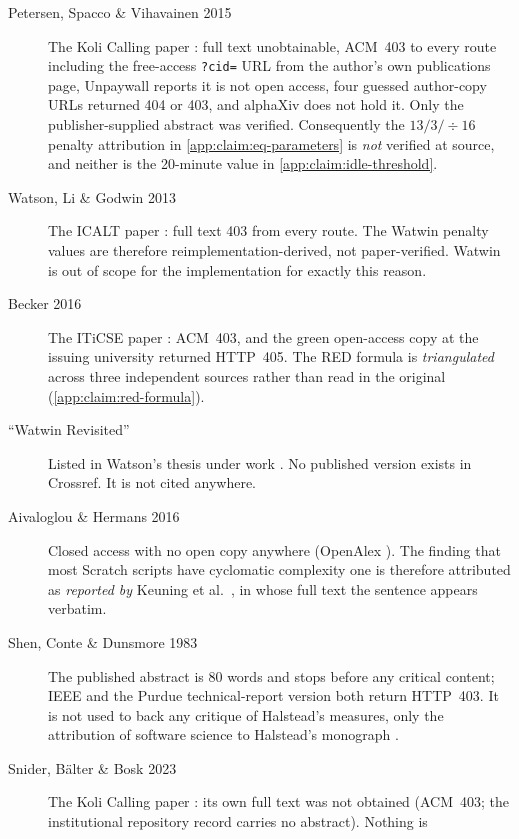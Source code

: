 \begin{description}
\item[Petersen, Spacco \& Vihavainen 2015] The Koli Calling paper
  \autocite{petersen2015exploration}: full text unobtainable, ACM~403 to
  every route including the free-access \nolinkurl{?cid=} URL from the
  author's own publications page, Unpaywall
  reports it is not open access, four guessed author-copy URLs returned 404
  or 403, and alphaXiv does not hold it.  Only the publisher-supplied
  abstract was verified.  Consequently the \(13/3/{\div}16\) penalty
  attribution in \cref{app:claim:eq-parameters} is \emph{not} verified at
  source, and neither is the 20-minute value in
  \cref{app:claim:idle-threshold}.
\item[Watson, Li \& Godwin 2013] The ICALT paper
  \autocite{watson2013predicting}: full text 403 from every route.  The
  Watwin penalty values are therefore reimplementation-derived, not
  paper-verified.  Watwin is out of scope for the implementation for exactly
  this reason.
\item[Becker 2016] The ITiCSE paper \autocite{becker2016new}: ACM~403, and
  the green open-access copy at the issuing university returned HTTP~405.
  The RED
  formula is \emph{triangulated} across three independent sources rather
  than read in the original (\cref{app:claim:red-formula}).
\item[\enquote{Watwin Revisited}] Listed in Watson's thesis under work
  .  No published version exists in
  Crossref.  It is not cited anywhere.
\item[Aivaloglou \& Hermans 2016] Closed access with no open copy anywhere
  (OpenAlex ).  The finding that most Scratch
  scripts have cyclomatic complexity one is therefore attributed as
  \emph{reported by} Keuning et al.\ \autocite{Keuning2017}, in whose full
  text the sentence appears verbatim.
\item[Shen, Conte \& Dunsmore 1983] The published abstract is 80 words and
  stops before any critical content; IEEE and the Purdue technical-report
  version both return HTTP~403.  It is not used to back any critique of
  Halstead's measures, only the attribution of software science to
  Halstead's monograph \autocite{Halstead1977}.
\item[Snider, B\"alter \& Bosk 2023] The Koli Calling paper
  \autocite{snider2023edit}: its own full text was not obtained (ACM~403;
  the institutional repository record carries no abstract).  Nothing is

\end{description}
